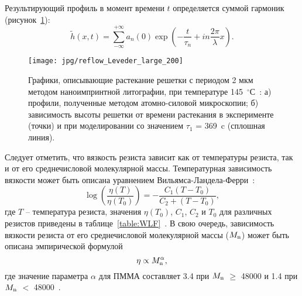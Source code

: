 Результирующий профиль в момент времени $t$ определяется суммой гармоник (рисунок~\ref{fig:ferlow_analytical}):
\begin{equation}
	\tilde{h}(x, t)=\sum_{-\infty}^{+\infty} a_n(0) \exp \left(-\frac{t}{\tau_n}+i n \frac{2 \pi}{\lambda} x\right).
\end{equation}
\begin{figure}[h]
	\begin{center}
		\texttt{[image: jpg/reflow\_Leveder\_large\_200]}
		\caption{Графики, описывающие растекание решетки с периодом 2 мкм методом наноимпринтной литографии, при температуре 145~$^\circ$С~\cite{Leveder_2011}: а) профили, полученные методом атомно-силовой микроскопии; б) зависимость высоты решетки от времени растекания в эксперименте (точки) и при моделировании со значением $\tau_1$ = 369~c (сплошная линия).}
		\label{fig:ferlow_analytical}
	\end{center}
\end{figure}

Следует отметить, что вязкость резиста зависит как от температуры резиста, так и от его среднечисловой молекулярной массы.
Температурная зависимость вязкости может быть описана уравнением Вильямса-Ландела-Ферри~\cite{bird1987dynamics_WLF}:
\begin{equation} \label{eq:WLF}
	\log \left( \frac{\eta(T)}{\eta(T_0)} \right) = -\frac{C_1(T-T_0)}{C_2+(T-T_0)},
\end{equation}
где $T$ -- температура резиста, значения $\eta(T_0)$, $C_1$, $C_2$ и $T_0$ для различных резистов приведены в таблице~\ref{table:WLF}~\cite{aho2008measurement_WLF}.
В свою очередь, зависимость вязкости резиста от его среднечисловой молекулярной массы ($M_\mathrm{n}$) может быть описана эмпирической формулой
\begin{equation} \label{eq:3p4_3p1}
	\eta \propto M_\mathrm{n}^\alpha,
\end{equation}
где значение параметра $\alpha$ для ПММА составляет 3.4 при $M_\mathrm{n}$ $\geq$ 48000 и 1.4 при $M_\mathrm{n}$ $<$ 48000~\cite{Leveder_2010, Bueche_3p4_1p4}.

